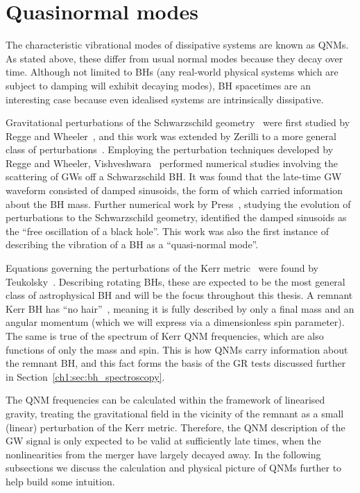 \section{Quasinormal modes}
\label{ch1:sec:qnms}

The characteristic vibrational modes of dissipative systems are known as QNMs.
As stated above, these differ from usual normal modes because they decay over time.
Although not limited to BHs (any real-world physical systems which are subject to damping will exhibit decaying modes), BH spacetimes are an interesting case because even idealised systems are intrinsically dissipative. 

Gravitational perturbations of the Schwarzschild geometry~\cite{Schwarzschild:1916uq} were first studied by Regge and Wheeler~\cite{Regge:1957td}, and this work was extended by Zerilli to a more general class of perturbations~\cite{Zerilli:1970se, Zerilli:1970wzz}.
Employing the perturbation techniques developed by Regge and Wheeler, Vishveshwara~\cite{Vishveshwara:1970zz} performed numerical studies involving the scattering of GWs off a Schwarzschild BH.
It was found that the late-time GW waveform consisted of damped sinusoids, the form of which carried information about the BH mass. 
Further numerical work by Press~\cite{Press:1971wr}, studying the evolution of perturbations to the Schwarzschild geometry, identified the damped sinusoids as the ``free oscillation of a black hole''.
This work was also the first instance of describing the vibration of a BH as a ``quasi-normal mode''.

Equations governing the perturbations of the Kerr metric~\cite{Kerr:1963ud} were found by Teukolsky~\cite{Teukolsky:1972my, Teukolsky:1973ha}. 
Describing rotating BHs, these are expected to be the most general class of astrophysical BH and will be the focus throughout this thesis. 
A remnant Kerr BH has ``no hair''~\cite{Carter:1971zc}, meaning it is fully described by only a final mass and an angular momentum (which we will express via a dimensionless spin parameter). 
The same is true of the spectrum of Kerr QNM frequencies, which are also functions of only the mass and spin. 
This is how QNMs carry information about the remnant BH, and this fact forms the basis of the GR tests discussed further in Section~\ref{ch1:sec:bh_spectroscopy}.

The QNM frequencies can be calculated within the framework of linearised gravity, treating the gravitational field in the vicinity of the remnant as a small (linear) perturbation of the Kerr metric.
Therefore, the QNM description of the GW signal is only expected to be valid at sufficiently late times, when the nonlinearities from the merger have largely decayed away. 
In the following subsections we discuss the calculation and physical picture of QNMs further to help build some intuition.

